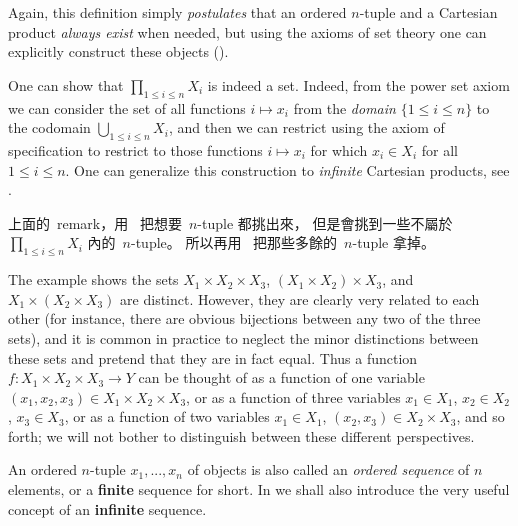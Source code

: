 Again, this definition simply \emph{postulates} that an ordered \(n\)-tuple and a Cartesian product \emph{always exist} when needed,
but using the axioms of set theory one can explicitly construct these objects ().

\begin{remark} \label{remark 3.5.8}
One can show that \(\prod_{1 \leq i \leq n} X_i\) is indeed a set.
Indeed, from the power set axiom  we can consider the set of all functions \(i \mapsto x_i\) from the \emph{domain} \(\{1 \leq i \leq n\}\) to the codomain \(\bigcup_{1 \leq i \leq n} X_i\),
and then we can restrict using the axiom of specification  to restrict to those functions \(i \mapsto x_i\) for which \(x_i \in X_i\) for all \(1 \leq i \leq n\).
One can generalize this construction to \emph{infinite} Cartesian products, see .
\end{remark}

\begin{note}
上面的\ remark，用\  把想要\ \(n\)-tuple 都挑出來，
但是會挑到一些不屬於\ \(\prod_{1 \leq i \leq n} X_i\) 內的\ \(n\)-tuple。
所以再用\  把那些多餘的\ \(n\)-tuple 拿掉。
\end{note}

\begin{example}
The example shows the sets \(X_1 \times X_2 \times X_3\), \((X_1 \times X_2) \times X_3\), and \(X_1 \times (X_2 \times X_3)\) are distinct.
However, they are clearly very related to each other (for instance, there are obvious bijections between any two of the three sets),
and it is common in practice to neglect the minor distinctions between these sets and pretend that they are in fact equal.
Thus a function \(f : X_1 \times X_2 \times X_3 \to Y\) can be thought of as
a function of one variable \((x_1, x_2, x_3) \in X_1 \times X_2 \times X_3\),
or as a function of three variables \(x_1 \in X_1\), \(x_2 \in X_2\), \(x_3 \in X_3\),
or as a function of two variables \(x_1 \in X_1\), \((x_2, x_3) \in X_2 \times X_3\), and so forth;
we will not bother to distinguish between these different perspectives.
\end{example}

\begin{remark} \label{remark 3.5.10}
An ordered \(n\)-tuple \(x_1, ..., x_n\) of objects is also called an \emph{ordered sequence} of \(n\) elements, or a \textbf{finite} sequence for short.
In  we shall also introduce the very useful concept of an \textbf{infinite}
sequence.
\end{remark}

